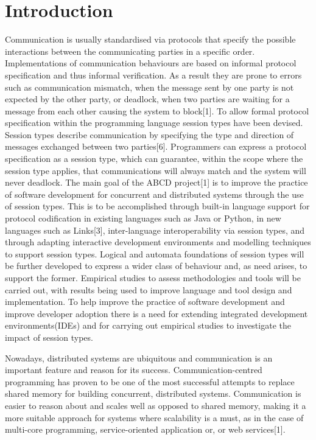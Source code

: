\section{Introduction}


Communication is usually standardised via protocols that specify the possible interactions between the communicating parties in a specific order. Implementations of communication behaviours are based on informal protocol specification and thus informal verification. As a result they are prone to errors such as communication mismatch, when the message sent by one party is not expected by the other party, or deadlock, when two parties are waiting for a message from each other causing the system to block[1]. To allow formal protocol specification within the programming language session types have been devised. Session types describe communication by specifying the type and direction of messages exchanged between two parties[6]. Programmers can express a protocol specification as a session type, which can guarantee, within the scope where the session type applies, that communications will always match and the system will never deadlock.
The main goal of the ABCD project[1] is to improve the practice of software development for concurrent and distributed systems through the use of session types. This is to be accomplished through built-in language support for protocol codification in existing languages such as Java or Python, in new languages such as Links[3], inter-language interoperability via session types, and through adapting interactive development environments and modelling techniques to support session types. Logical and automata foundations of session types will be further developed to express a wider class of behaviour and, as need arises, to support the former. Empirical studies to assess methodologies and tools will be carried out, with results being used to improve language and tool design and implementation.
To help improve the practice of software development and improve developer adoption there is a need for extending integrated development environments(IDEs) and for carrying
out empirical studies to investigate the impact of session types.






Nowadays, distributed systems are ubiquitous and communication is an important feature and reason for its success. Communication-centred programming has proven to be one of the most successful attempts to replace shared memory for building concurrent, distributed systems. Communication is easier to reason about and scales well as opposed to shared memory, making it a more suitable approach for systems where scalability is a must, as in the case of multi-core programming, service-oriented application or, or web services[1].


